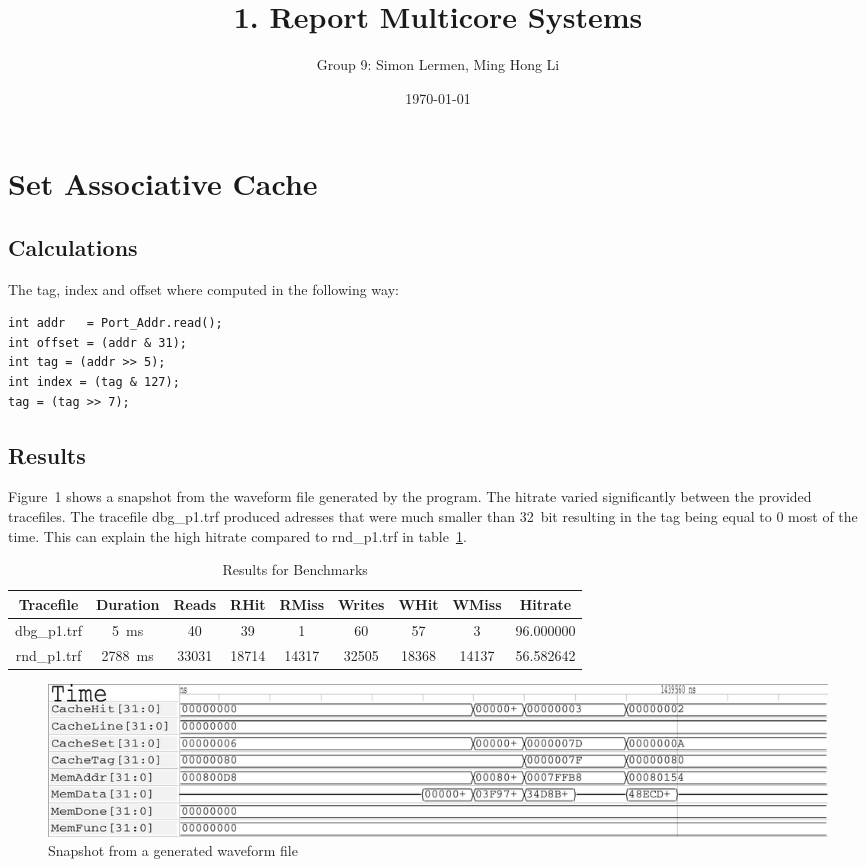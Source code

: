\documentclass[11pt]{scrartcl}
\title{1. Report Multicore Systems}
\author{Group 9: Simon Lermen, Ming Hong Li}
\date{\today}
\begin{document}
\maketitle
\section{Set Associative Cache}

\subsection{Calculations}

The tag, index and offset where computed in the following way:
\begin{lstlisting}
int addr   = Port_Addr.read();
int offset = (addr & 31);
int tag = (addr >> 5);
int index = (tag & 127);     
tag = (tag >> 7); 
\end{lstlisting}

\subsection{Results}

Figure~1 shows a snapshot from the waveform file generated by the program.
The hitrate varied significantly between the provided tracefiles. The tracefile dbg\_p1.trf produced adresses that were much smaller than 32~bit resulting in the tag being equal to 0 most of the time. This can explain the high hitrate compared to rnd\_p1.trf in table~\ref{table:bench}. 

\begin{table}
\begin{tabular}{|c|c|c|c|c|c|c|c|c|}
\hline
Tracefile & Duration &	Reads &	RHit &	RMiss &	Writes &	WHit &	WMiss	& Hitrate \\
\hline
dbg\_p1.trf & 5~ms	& 40	& 39&	1&	60	&57&	3&	96.000000 \\
rnd\_p1.trf & 2788~ms &	33031 &	18714 &	14317	&32505&	18368&	14137	&56.582642 \\
\hline

\end{tabular}
\caption{Results for Benchmarks}
\label{table:bench}
\end{table}


\begin{figure}
\centering
\includegraphics[scale=0.7]{./graphics/wavefilecut.pdf}

\caption{Snapshot from a generated waveform file}
\label{fig:waveform}
\end{figure}
\end{document}

